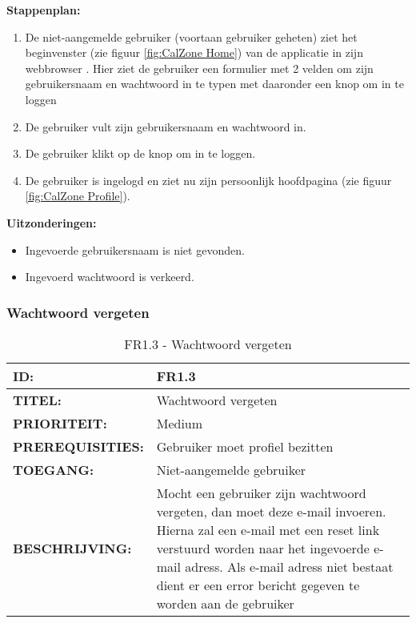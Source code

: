 \textbf{Stappenplan:}
\begin{enumerate}
\item De niet-aangemelde gebruiker (voortaan gebruiker geheten) ziet het beginvenster (zie figuur \ref{fig:CalZone Home}) van de applicatie in zijn webbrowser . Hier ziet de gebruiker een formulier met 2 velden om zijn gebruikersnaam en wachtwoord in te typen met daaronder een knop om in te loggen
\item De gebruiker vult zijn gebruikersnaam en wachtwoord in.
\item De gebruiker klikt op de knop om in te loggen.
\item De gebruiker is ingelogd en ziet nu zijn persoonlijk hoofdpagina (zie figuur \ref{fig:CalZone Profile}).
\end{enumerate}

\textbf{Uitzonderingen:}
\begin{itemize}
\item Ingevoerde gebruikersnaam is niet gevonden.
\item Ingevoerd wachtwoord is verkeerd.
\end{itemize}


\subsubsection{Wachtwoord vergeten}
\noindent\begin{table}[H]
            \begin{tabular}{l | p{10cm}}
                \textbf{ID:} & FR1.3 \\ \hline
                \textbf{TITEL:} & Wachtwoord vergeten \\ \hline
                \textbf{PRIORITEIT:} &  Medium \\ \hline
                \textbf{PREREQUISITIES:} & Gebruiker moet profiel bezitten\\ \hline
                \textbf{TOEGANG:} &  Niet-aangemelde gebruiker \\ \hline
                \textbf{BESCHRIJVING:} & Mocht een gebruiker zijn wachtwoord vergeten, dan moet deze e-mail invoeren. 
                                        Hierna zal een e-mail met een reset link verstuurd worden naar het ingevoerde e-mail adress. 
                                        Als e-mail adress niet bestaat dient er een error bericht gegeven te worden aan de gebruiker\\
            \end{tabular}\\
            \caption{FR1.3 - Wachtwoord vergeten}
            \label{tab:FR1.3 - Wachtwoord vergeten}
        \end{table}

